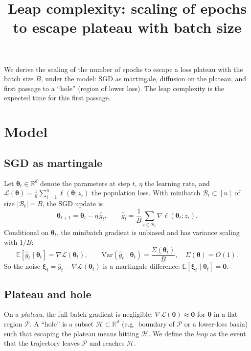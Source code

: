 \documentclass[11pt]{article}
\title{Leap complexity: scaling of epochs to escape plateau with batch size}
\author{}
\date{}
\newcommand{\E}{\mathbb{E}}
\newcommand{\R}{\mathbb{R}}
\newcommand{\Var}{\mathrm{Var}}
\newcommand{\calL}{\mathcal{L}}
\newcommand{\btheta}{\bm{\theta}}
\newcommand{\bxi}{\bm{\xi}}
\newcommand{\bzero}{\bm{0}}
\begin{document}
\maketitle

We derive the scaling of the number of epochs to escape a loss plateau with the batch size $B$, under the model: SGD as martingale, diffusion on the plateau, and first passage to a ``hole'' (region of lower loss). The leap complexity is the expected time for this first passage.

\section{Model}

\subsection{SGD as martingale}

Let $\btheta_t \in \R^d$ denote the parameters at step $t$, $\eta$ the learning rate, and $\calL(\btheta) = \frac{1}{n}\sum_{i=1}^n \ell(\btheta; z_i)$ the population loss. With minibatch $\mathcal{B}_t \subset [n]$ of size $|\mathcal{B}_t| = B$, the SGD update is
\begin{equation}
\btheta_{t+1} = \btheta_t - \eta \, \widehat{g}_t, \qquad \widehat{g}_t = \frac{1}{B} \sum_{i \in \mathcal{B}_t} \nabla \ell(\btheta_t; z_i).
\end{equation}
Conditional on $\btheta_t$, the minibatch gradient is unbiased and has variance scaling with $1/B$:
\begin{equation}
\E[\widehat{g}_t \mid \btheta_t] = \nabla \calL(\btheta_t), \qquad \Var(\widehat{g}_t \mid \btheta_t) = \frac{\Sigma(\btheta_t)}{B}, \quad \Sigma(\btheta) = O(1).
\end{equation}
So the noise $\bxi_t = \widehat{g}_t - \nabla \calL(\btheta_t)$ is a martingale difference: $\E[\bxi_t \mid \btheta_t] = \bzero$.

\subsection{Plateau and hole}

On a \emph{plateau}, the full-batch gradient is negligible: $\nabla \calL(\btheta) \approx \bzero$ for $\btheta$ in a flat region $\mathcal{P}$. A ``hole'' is a subset $\mathcal{H} \subset \R^d$ (e.g.\ boundary of $\mathcal{P}$ or a lower-loss basin) such that escaping the plateau means hitting $\mathcal{H}$. We define the \emph{leap} as the event that the trajectory leaves $\mathcal{P}$ and reaches $\mathcal{H}$.
\end{document}
